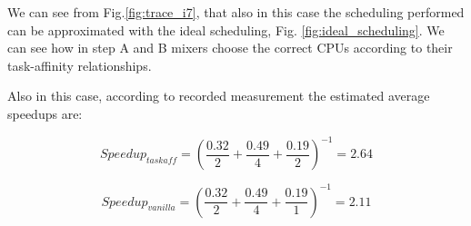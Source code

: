 We can see from Fig.\ref{fig:trace_i7}, that also in this case the scheduling performed can be approximated with the ideal scheduling, Fig.
\ref{fig:ideal_scheduling}. We can see how in step A and B mixers choose the correct CPUs according to their task-affinity relationships.

Also in this case, according to recorded measurement the estimated average speedups are:

\begin{equation}
  Speedup_{taskaff} = \left(\frac{0.32}{2} + \frac{0.49}{4} + \frac{0.19}{2} \right)^{-1} = 2.64
\label{eq:speedup_i7_taskaff}
\end{equation}

\begin{equation}
  Speedup_{vanilla} = \left(\frac{0.32}{2} + \frac{0.49}{4} + \frac{0.19}{1} \right)^{-1} = 2.11
\label{eq:speedup_i7_van}
\end{equation}

\begin{table}[tbp]
\centering%
\hspace{4em}
\label{tab:final_speedup}
\caption{Comparison between task-affinity and vanilla on Intel Xeon and Intel i7}
\end{table}

